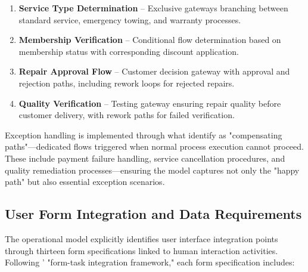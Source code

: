 \documentclass[14pt,a4paper]{article}
\begin{document}
\begin{enumerate}
    \item \textbf{Service Type Determination} – Exclusive gateways branching between standard service, emergency towing, and warranty processes.

    \item \textbf{Membership Verification} – Conditional flow determination based on membership status with corresponding discount application.

    \item \textbf{Repair Approval Flow} – Customer decision gateway with approval and rejection paths, including rework loops for rejected repairs.

    \item \textbf{Quality Verification} – Testing gateway ensuring repair quality before customer delivery, with rework paths for failed verification.
\end{enumerate}

Exception handling is implemented through what \textit{\parencite[p. 136]{Meyer2019}} identify as "compensating paths"—dedicated flows triggered when normal process execution cannot proceed. These include payment failure handling, service cancellation procedures, and quality remediation processes—ensuring the model captures not only the "happy path" but also essential exception scenarios.

\subsection{User Form Integration and Data Requirements}

The operational model explicitly identifies user interface integration points through thirteen form specifications linked to human interaction activities. Following \textit{\parencite[p. 167]{Pulvermueller2022}}' "form-task integration framework," each form specification includes:
\end{document}
